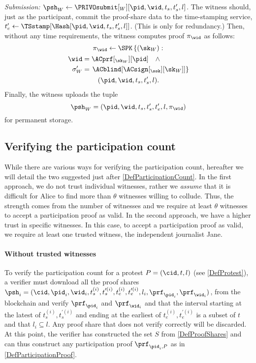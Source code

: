 \emph{Submission: \(\psh_W\gets \PRIVOsubmit[_W][\pid, \wid, t_s, t_s', l]\).}
The witness should, just as the participant, commit the proof-share data to the time-stamping service, \(t_e'\gets \TSstamp[\Hash[\pid, \wid, t_s, t_s', l]]\).
(This is only for redundancy.)
Then, without any time requirements, the witness computes  proof 
\(\pi_{\wid}\) as follows:
\begin{multline*}
  \pi_{\wid}\gets \SPK\left\{ (\sk_W) : \right. \\
    \begin{aligned}
      \wid &= \ACprf[_{\sk_W}][\pid] \quad \land \\
      \sigma_W' &= \left. \ACblind[\ACsign[_{\ssk}][\sk_W]] \right\}
    \end{aligned} \\
      (\pid, \wid, t_s, t_s', l).
\end{multline*}
Finally, the witness uploads the tuple \[ \psh_W = (\pid, \wid, t_s, t_s', t_e', l, \pi_{\wid}) \] for permanent storage.

\subsection{Verifying the participation count}
\label{ProtocolVerification}

While there are various ways for verifying the participation count, hereafter we will detail the two suggested just after \cref{DefParticipationCount}.
In the first approach, we do not trust individual witnesses, rather we \emph{assume} that it is difficult for Alice to find more than \(\theta\) witnesses willing to collude.
Thus, the strength comes from the number of witnesses and we require at least \(\theta\) witnesses to accept a participation proof as valid.
In the second approach, we have a higher trust in specific witnesses.
In this case, to accept a participation proof as valid, we require at least one trusted witness, the independent journalist Jane.

\paragraph{Without trusted witnesses}

To verify the participation count for a protest \(P = (\cid, t, l)\) (see \cref{DefProtest}), a verifier must download all the proof shares \(\psh_i =   (\cid, \pid_i, \wid_i, t_s^{(i)}, t_s^{\prime (i)}, t_e^{(i)}, t_e^{\prime   (i)}, l_i, \prf_{\pid_i}, \prf_{\wid_i})\), from the blockchain and verify \(\prf_{\pid_i}\) and \(\prf_{\wid_i}\) and that the interval starting at the latest of \(t_s^{(i)}, t_s^{\prime (i)}\) and ending at the earliest of \(t_e^{(i)}, t_e^{\prime (i)}\) is a subset of \(t\) and that \(l_i\subseteq  l\).
Any proof share that does not verify correctly will be discarded.
At this point, the verifier has constructed the set \(S\) from \cref{DefProofShares} and can thus construct any participation proof \(\prf_{\pid_i, P}\) as in \cref{DefParticipationProof}.

